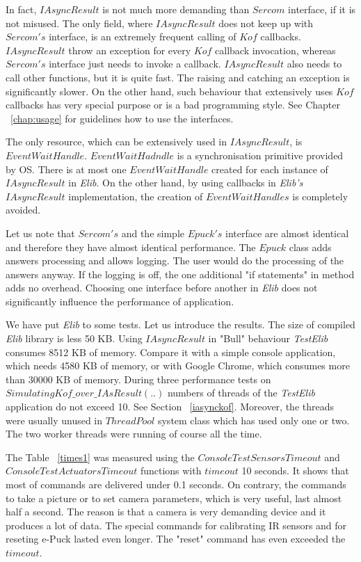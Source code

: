 \documentclass[12pt,notitlepage]{report}
\begin{document}
	In fact, $IAsyncResult$ is not much more demanding than $Sercom$ interface, if it is not misused.
	The only field, where $IAsyncResult$ does not keep up with $Sercom's$ interface, 
	is an extremely frequent calling of $Kof$ callbacks.
	$IAsyncResult$ throw an exception for every $Kof$ callback invocation, 
	whereas $Sercom's$ interface just needs to invoke a callback.
	$IAsyncResult$ also needs to call other functions, but it is quite fast. 
	The raising and catching an exception is significantly slower.
	On the other hand, such behaviour that extensively uses $Kof$ callbacks 
	has very special purpose or is a bad programming style.
	See Chapter ~\ref{chap:usage} for guidelines how to use the interfaces.

	The only resource, which can be extensively used in $IAsyncResult$, is $EventWaitHandle$. 
	$EventWaitHadndle$ is a synchronisation primitive provided
	by OS. There is at most one $EventWaitHandle$ created for each instance of $IAsyncResult$ in {\it Elib}. 
	On the other hand, by using callbacks in {\it Elib's} $IAsyncResult$
	implementation, the creation of $EventWaitHandles$ is completely avoided.

	Let us note that $Sercom's$ and the simple $Epuck's$ interface 
	are almost identical and therefore they have almost identical performance.
	The $Epuck$ class adds answers processing and allows logging. The user would do the processing of the answers anyway.
	If the logging is off, the one additional "if statements" in method adds no overhead. 
	Choosing one interface before another in {\it Elib} does not significantly influence the performance of application.

	We have put {\it Elib} to some tests. Let us introduce the results.
	The size of compiled {\it Elib} library is less 50 KB.
	Using $IAsyncResult$ in "Bull" behaviour  {\it TestElib} consumes 8512 KB of memory.
	Compare it with a simple console application, which needs 4580 KB of memory, or with Google Chrome, 
	which consumes more than 30000 KB of memory.
	During three performance tests on $SimulatingKof\_over\_IAsResult(..)$
	numbers of threads of the {\it TestElib} application do not exceed 10. 
	See Section ~\ref{iasynckof}. Moreover, the threads were usually unused
	in $ThreadPool$ system class which has used only one or two. 
	The two worker threads were running of course all the time.

	The Table ~\ref{times1}  was measured using the $ConsoleTestSensorsTimeout$ and
	$ConsoleTestActuatorsTimeout$ functions with $timeout$ 10 seconds.
	It shows that most of commands are delivered under 0.1 seconds. 
	On contrary, the commands to take a picture or to set camera parameters, 
	which is very useful, last almost half a second. 
	The reason is that a camera is very demanding device and it produces a lot of data.
	The special commands for calibrating IR sensors and for reseting e-Puck lasted even longer.
	The "reset" command has even exceeded the $timeout$.
\end{document}

